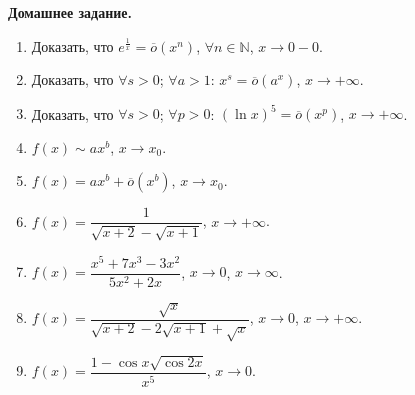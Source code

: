 \documentclass[12pt]{article}
\begin{document}
	\begin{center}
		\textbf{\Large{Домашнее задание.}}
	\end{center}
	\begin{enumerate}
		\item Доказать, что $e^{\frac{1}{x}} = \overline{o}\left(x^n\right)$, $\forall n \in \mathbb{N}$, $x \rightarrow 0 - 0$.
		\item Доказать, что $\forall s > 0$; $\forall a > 1$: $x^s = \overline{o}\left(a^x\right)$, $x \rightarrow + \infty$.
		\item Доказать, что $\forall s > 0$; $\forall p > 0$: $\left(\ln x\right)^5 = \overline{o}\left(x^p\right)$, $x \rightarrow + \infty$.
		\item $f(x) \sim ax^b$, $x \rightarrow x_0$.
		\item $f(x) = ax^b + \overline{o}(x^b)$, $x \rightarrow x_0$.
		\item $f(x) = \dfrac{1}{\sqrt{x + 2} - \sqrt{x + 1}}$, $x \rightarrow + \infty$.
		\item $f(x) = \dfrac{x^5 + 7x^3 - 3x^2}{5x^2 + 2x}$, $x \rightarrow 0$, $x \rightarrow \infty$.
		\item $f(x) = \dfrac{\sqrt{x}}{\sqrt{x + 2} - 2\sqrt{x + 1} + \sqrt{x}}$, $x \rightarrow 0$, $x \rightarrow + \infty$.
		\item $f(x) = \dfrac{1 - \cos x \sqrt{\cos 2x}}{x^5}$, $x \rightarrow 0$.
	\end{enumerate}
\end{document}
